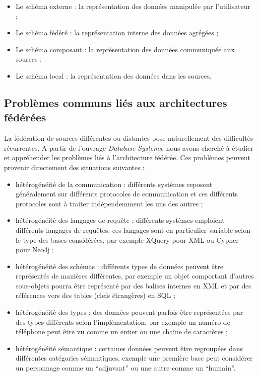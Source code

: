 \begin{itemize}
    \item Le schéma externe : la représentation des données manipulée par l’utilisateur ;

    \item Le schéma fédéré : la représentation interne des données agrégées ;

    \item Le schéma composant : la représentation des données communiquée aux sources ;

    \item Le schéma local : la représentation des données dans les sources.
\end{itemize}

\subsection{Problèmes communs liés aux architectures fédérées}

La fédération de sources différentes ou distantes pose naturellement des difficultés récurrentes. A partir de l’ouvrage \textit{Database Systems}\cite{bib:dbsys}, nous avons cherché à étudier et appréhender les problèmes liés à l’architecture fédérée. Ces problèmes peuvent provenir directement des situations suivantes :

\begin{itemize}
    \item hétérogénéité de la communication : différents systèmes reposent généralement sur différents protocoles de communication et ces différents protocoles sont à traiter indépendemment les uns des autres ;
    \item hétérogénéité des langages de requête : différents systèmes emploient différents langages de requêtes, ces langages sont en particulier variable selon le type des bases considérées, par exemple XQuery pour XML ou Cypher pour Neo4j ;
    \item hétérogénéité des schémas : différents types de données peuvent être représentés de manières différentes, par exemple un objet comportant d’autres sous-objets pourra être représenté par des balises internes en XML et par des références vers des tables (clefs étrangères) en SQL ;
    \item  hétérogénéité des types : des données peuvent parfois être représentées par des types différents selon l’implémentation, par exemple un numéro de téléphone peut être vu comme un entier ou une chaîne de caractères ;
    \item hétérogénéité sémantique : certaines données peuvent être regroupées dans différentes catégories sémantiques, exemple une première base peut considérer un personnage comme un “adjuvant” ou une autre comme un “humain”.
\end{itemize}

